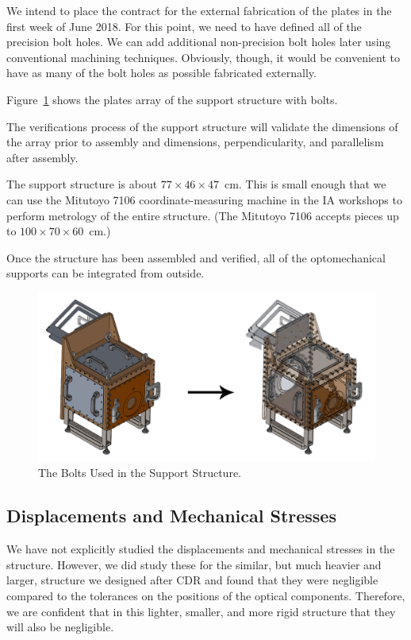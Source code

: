 \documentclass{article}
\begin{document}
We intend to place the contract for the external fabrication of the plates in the first week of June 2018. For this point, we need to have defined all of the precision bolt holes. We can add additional non-precision bolt holes later using conventional machining techniques. Obviously, though, it would be convenient to have as many of the bolt holes as possible fabricated externally.

Figure~\ref{figure:alex-bolts} shows the plates array of the support structure with bolts.

The verifications process of the support structure will validate the dimensions of the array prior to assembly and dimensions, perpendicularity, and parallelism after assembly. 

The support structure is about $77 \times 46 \times 47$~cm. This is small enough that we can use the Mitutoyo 7106 coordinate-measuring machine in the IA workshops to perform metrology of the entire structure. (The Mitutoyo 7106 accepts pieces up to $100 \times 70 \times 60$~cm.) 

Once the structure has been assembled and verified, all of the optomechanical supports can be integrated from outside.

\begin{figure}
\begin{center}
\includegraphics[width=\linewidth]{newfigures/Fig3_7.png}
\end{center}
\caption{The Bolts Used in the Support Structure.}
\label{figure:alex-bolts}
\end{figure}

\subsection{Displacements and Mechanical Stresses}

We have not explicitly studied the displacements and mechanical stresses in the structure. However, we did study these for the similar, but much heavier and larger, structure we designed after CDR and found that they were negligible compared to the tolerances on the positions of the optical components. Therefore, we are confident that in this lighter, smaller, and more rigid structure that they will also be negligible.
\end{document}
